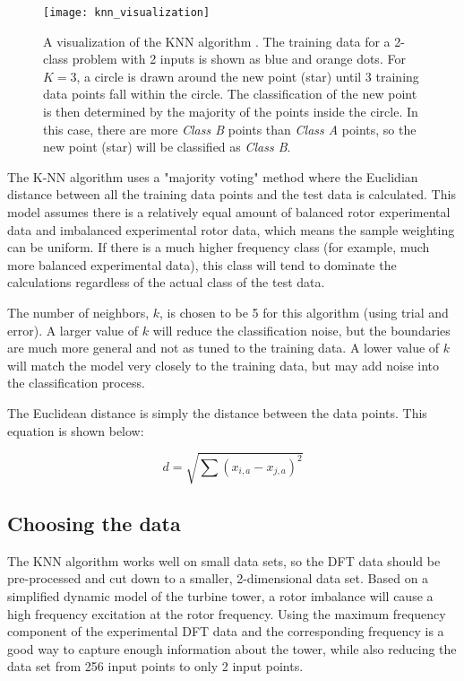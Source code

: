 \begin{figure}
	\centering
	\texttt{[image: knn\_visualization]}
	\decoRule
	\caption{A visualization of the KNN algorithm \cite{knn_python}.  The training data for a 2-class problem with 2 inputs is shown as blue and orange dots.  For $K=3$, a circle is drawn around the new point (star) until 3 training data points fall within the circle.  The classification of the new point is then determined by the majority of the points inside the circle.  In this case, there are more \textit{Class B} points than \textit{Class A} points, so the new point (star) will be classified as \textit{Class B}.}
	\label{fig:knn_visualization}
\end{figure}

The K-NN algorithm uses a "majority voting" method where the Euclidian distance between all the training data points and the test data is calculated.  This model assumes there is a relatively equal amount of balanced rotor experimental data and imbalanced experimental rotor data, which means the sample weighting can be uniform.  If there is a much higher frequency class (for example, much more balanced experimental data), this class will tend to dominate the calculations regardless of the actual class of the test data.

The number of neighbors, $k$, is chosen to be 5 for this algorithm (using trial and error).  A larger value of $k$ will reduce the classification noise, but the boundaries are much more general and not as tuned to the training data.  A lower value of $k$ will match the model very closely to the training data, but may add noise into the classification process.

The Euclidean distance is simply the distance between the data points.  This equation is shown below:

\begin{equation}
	d = \sqrt{\sum{\left(x_{i,a}-x_{j,a}\right)^2}}
\end{equation}

\subsection{Choosing the data}
The KNN algorithm works well on small data sets, so the DFT data should be pre-processed and cut down to a smaller, 2-dimensional data set.  Based on a simplified dynamic model of the turbine tower, a rotor imbalance will cause a high frequency excitation at the rotor frequency.  Using the maximum frequency component of the experimental DFT data and the corresponding frequency is a good way to capture enough information about the tower, while also reducing the data set from 256 input points to only 2 input points.

